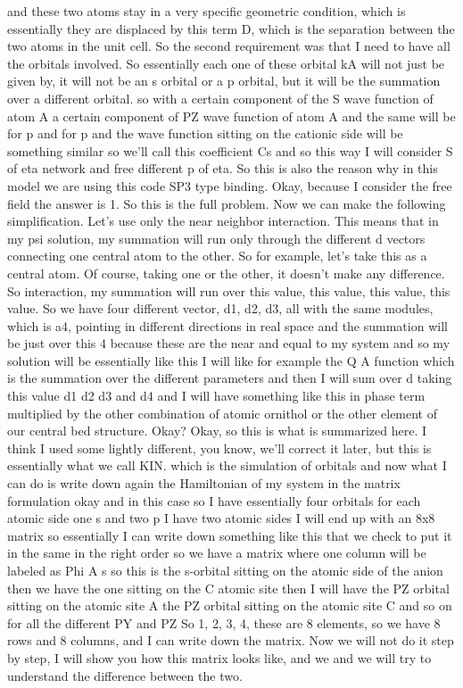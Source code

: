 and these two atoms stay in a very specific geometric condition, which is essentially they are displaced by this term D, which is the separation between the two atoms in the unit cell. So the second requirement was that I need to have all the orbitals involved. So essentially each one of these orbital kA will not just be given by, it will not be an s orbital or a p orbital, but it will be the summation over a different orbital. so with a certain component of the S wave function of atom A a certain component of PZ wave function of atom A and the same will be for p and for p and the wave function sitting on the cationic side will be something similar so we'll call this coefficient Cs and so this way I will consider S of eta network and free different p of eta. So this is also the reason why in this model we are using this code SP3 type binding. Okay, because I consider the free field the answer is 1. So this is the full problem. Now we can make the following simplification. Let's use only the near neighbor interaction. This means that in my psi solution, my summation will run only through the different d vectors connecting one central atom to the other. So for example, let's take this as a central atom. Of course, taking one or the other, it doesn't make any difference. So interaction, my summation will run over this value, this value, this value, this value. So we have four different vector, d1, d2, d3, all with the same modules, which is a4, pointing in different directions in real space and the summation will be just over this 4 because these are the near and equal to my system and so my solution will be essentially like this I will like for example the Q A function which is the summation over the different parameters and then I will sum over d taking this value d1 d2 d3 and d4 and I will have something like this in phase term multiplied by the other combination of atomic ornithol or the other element of our central bed structure. Okay? Okay, so this is what is summarized here. I think I used some lightly different, you know, we'll correct it later, but this is essentially what we call KIN. which is the simulation of orbitals and now what I can do is write down again the Hamiltonian of my system in the matrix formulation okay and in this case so I have essentially four orbitals for each atomic side one s and two p I have two atomic sides I will end up with an 8x8 matrix so essentially I can write down something like this that we check to put it in the same in the right order so we have a matrix where one column will be labeled as Phi A s so this is the s-orbital sitting on the atomic side of the anion then we have the one sitting on the C atomic site then I will have the PZ orbital sitting on the atomic site A the PZ orbital sitting on the atomic site C and so on for all the different PY and PZ So 1, 2, 3, 4, these are 8 elements, so we have 8 rows and 8 columns, and I can write down the matrix. Now we will not do it step by step, I will show you how this matrix looks like, and we and we will try to understand the difference between the two.
